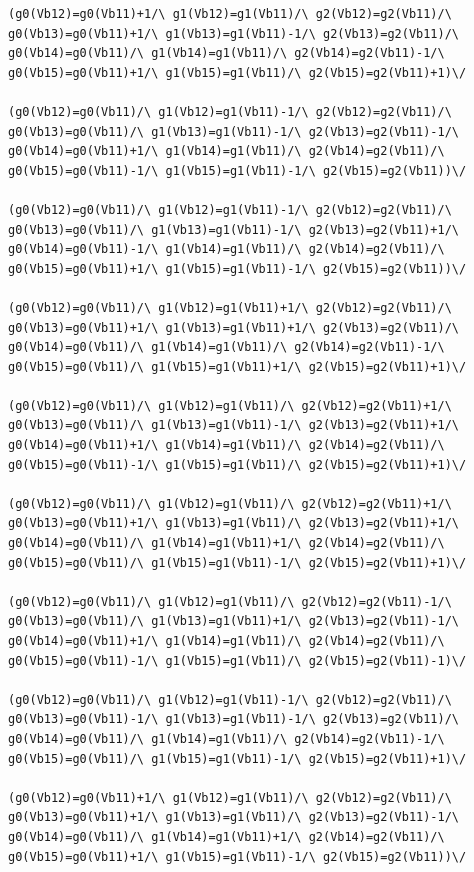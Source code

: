 \begin{appendices}
\begin{lstlisting}
(g0(Vb12)=g0(Vb11)+1/\ g1(Vb12)=g1(Vb11)/\ g2(Vb12)=g2(Vb11)/\ g0(Vb13)=g0(Vb11)+1/\ g1(Vb13)=g1(Vb11)-1/\ g2(Vb13)=g2(Vb11)/\ g0(Vb14)=g0(Vb11)/\ g1(Vb14)=g1(Vb11)/\ g2(Vb14)=g2(Vb11)-1/\ g0(Vb15)=g0(Vb11)+1/\ g1(Vb15)=g1(Vb11)/\ g2(Vb15)=g2(Vb11)+1)\/ 

(g0(Vb12)=g0(Vb11)/\ g1(Vb12)=g1(Vb11)-1/\ g2(Vb12)=g2(Vb11)/\ g0(Vb13)=g0(Vb11)/\ g1(Vb13)=g1(Vb11)-1/\ g2(Vb13)=g2(Vb11)-1/\ g0(Vb14)=g0(Vb11)+1/\ g1(Vb14)=g1(Vb11)/\ g2(Vb14)=g2(Vb11)/\ g0(Vb15)=g0(Vb11)-1/\ g1(Vb15)=g1(Vb11)-1/\ g2(Vb15)=g2(Vb11))\/ 

(g0(Vb12)=g0(Vb11)/\ g1(Vb12)=g1(Vb11)-1/\ g2(Vb12)=g2(Vb11)/\ g0(Vb13)=g0(Vb11)/\ g1(Vb13)=g1(Vb11)-1/\ g2(Vb13)=g2(Vb11)+1/\ g0(Vb14)=g0(Vb11)-1/\ g1(Vb14)=g1(Vb11)/\ g2(Vb14)=g2(Vb11)/\ g0(Vb15)=g0(Vb11)+1/\ g1(Vb15)=g1(Vb11)-1/\ g2(Vb15)=g2(Vb11))\/ 

(g0(Vb12)=g0(Vb11)/\ g1(Vb12)=g1(Vb11)+1/\ g2(Vb12)=g2(Vb11)/\ g0(Vb13)=g0(Vb11)+1/\ g1(Vb13)=g1(Vb11)+1/\ g2(Vb13)=g2(Vb11)/\ g0(Vb14)=g0(Vb11)/\ g1(Vb14)=g1(Vb11)/\ g2(Vb14)=g2(Vb11)-1/\ g0(Vb15)=g0(Vb11)/\ g1(Vb15)=g1(Vb11)+1/\ g2(Vb15)=g2(Vb11)+1)\/ 

(g0(Vb12)=g0(Vb11)/\ g1(Vb12)=g1(Vb11)/\ g2(Vb12)=g2(Vb11)+1/\ g0(Vb13)=g0(Vb11)/\ g1(Vb13)=g1(Vb11)-1/\ g2(Vb13)=g2(Vb11)+1/\ g0(Vb14)=g0(Vb11)+1/\ g1(Vb14)=g1(Vb11)/\ g2(Vb14)=g2(Vb11)/\ g0(Vb15)=g0(Vb11)-1/\ g1(Vb15)=g1(Vb11)/\ g2(Vb15)=g2(Vb11)+1)\/ 

(g0(Vb12)=g0(Vb11)/\ g1(Vb12)=g1(Vb11)/\ g2(Vb12)=g2(Vb11)+1/\ g0(Vb13)=g0(Vb11)+1/\ g1(Vb13)=g1(Vb11)/\ g2(Vb13)=g2(Vb11)+1/\ g0(Vb14)=g0(Vb11)/\ g1(Vb14)=g1(Vb11)+1/\ g2(Vb14)=g2(Vb11)/\ g0(Vb15)=g0(Vb11)/\ g1(Vb15)=g1(Vb11)-1/\ g2(Vb15)=g2(Vb11)+1)\/ 

(g0(Vb12)=g0(Vb11)/\ g1(Vb12)=g1(Vb11)/\ g2(Vb12)=g2(Vb11)-1/\ g0(Vb13)=g0(Vb11)/\ g1(Vb13)=g1(Vb11)+1/\ g2(Vb13)=g2(Vb11)-1/\ g0(Vb14)=g0(Vb11)+1/\ g1(Vb14)=g1(Vb11)/\ g2(Vb14)=g2(Vb11)/\ g0(Vb15)=g0(Vb11)-1/\ g1(Vb15)=g1(Vb11)/\ g2(Vb15)=g2(Vb11)-1)\/ 

(g0(Vb12)=g0(Vb11)/\ g1(Vb12)=g1(Vb11)-1/\ g2(Vb12)=g2(Vb11)/\ g0(Vb13)=g0(Vb11)-1/\ g1(Vb13)=g1(Vb11)-1/\ g2(Vb13)=g2(Vb11)/\ g0(Vb14)=g0(Vb11)/\ g1(Vb14)=g1(Vb11)/\ g2(Vb14)=g2(Vb11)-1/\ g0(Vb15)=g0(Vb11)/\ g1(Vb15)=g1(Vb11)-1/\ g2(Vb15)=g2(Vb11)+1)\/ 

(g0(Vb12)=g0(Vb11)+1/\ g1(Vb12)=g1(Vb11)/\ g2(Vb12)=g2(Vb11)/\ g0(Vb13)=g0(Vb11)+1/\ g1(Vb13)=g1(Vb11)/\ g2(Vb13)=g2(Vb11)-1/\ g0(Vb14)=g0(Vb11)/\ g1(Vb14)=g1(Vb11)+1/\ g2(Vb14)=g2(Vb11)/\ g0(Vb15)=g0(Vb11)+1/\ g1(Vb15)=g1(Vb11)-1/\ g2(Vb15)=g2(Vb11))\/ 


\end{lstlisting}
\end{appendices}
